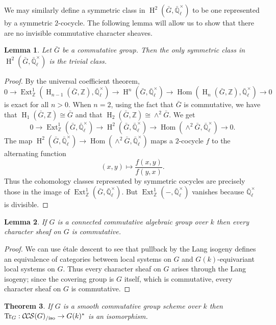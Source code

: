 \documentclass[10pt]{amsart}
\theoremstyle{plain}
\newtheorem{theorem}{Theorem}[section]
\newtheorem{lemma}[theorem]{Lemma}
\theoremstyle{definition}
\newcommand{\ZZ}{{\mathbb{Z}}}
\newcommand{\EE}{\mathbb{\bar Q}_\ell}
\newcommand{\Fq}{k}
\newcommand{\EEx}{\EE^\times}
\DeclareMathOperator{\Hom}{Hom}
\DeclareMathOperator{\Ext}{Ext}
\DeclareMathOperator{\Hh}{H}
\newcommand{\TrFrob}[1]{\operatorname{Tr}_{#1}}
\newcommand{\CCS}{{\mathcal{C\hskip-.8pt C\hskip-0.8pt S}}}
\newcommand{\CCSiso}[1]{\CCS(#1)_{/\text{iso}}}
\newcommand{\bG}{\bar{G}}
\begin{document}
We may similarly define a symmetric class in $\Hh^2(\bG, \EEx)$ to be one represented by a symmetric $2$-cocycle.
The following lemma will allow us to show that there are no invisible commutative character sheaves.

\begin{lemma} \label{lem:symtriv}
Let $\bG$ be a commutative group.  Then the only symmetric class in $\Hh^2(\bG, \EEx)$ is the trivial class.
\end{lemma}

\begin{proof}
By the universal coefficient theorem,
\[
0 \to \Ext^1_\ZZ(\Hh_{n-1}(\bG, \ZZ), \EEx) \to \Hh^n(\bG, \EEx) \to \Hom(\Hh_n(\bG, \ZZ), \EEx) \to 0
\]
is exact for all $n > 0$.  When $n = 2$, using the fact that $\bG$ is commutative, we have that $\Hh_1(\bG, \ZZ) \cong \bG$
and that $\Hh_2(\bG, \ZZ) \cong \wedge^2 \bG$. We get
\[
0 \to \Ext^1_\ZZ(\bG, \EEx) \to \Hh^2(\bG, \EEx) \to \Hom(\wedge^2 \bG, \EEx) \to 0.
\]
The map $\Hh^2(\bG, \EEx) \to \Hom(\wedge^2 \bG, \EEx)$ maps a $2$-cocycle $f$ to the alternating function
\[
(x,y) \mapsto \frac{f(x,y)}{f(y,x)}.
\]
Thus the cohomology classes represented by symmetric cocycles are precisely those in the image of $\Ext^1_\ZZ(\bG, \EEx)$.
But $\Ext^1_\ZZ(-, \EEx)$ vanishes because $\EEx$ is divisible.
\end{proof}

\begin{lemma} \label{lem:conncomm}
If $G$ is a connected commutative algebraic group over $\Fq$ then every character sheaf on $G$ is commutative.
\end{lemma}

\begin{proof}
We can use \'etale descent to see that pullback by the Lang isogeny defines an equivalence
of categories between local systems on $G$ and $G(\Fq)$-equivariant local systems on $G$.  Thus every character
sheaf on $G$ arises through the Lang isogeny; since the covering group is $G$ itself, which is commutative,
every character sheaf on $G$ is commutative.
\end{proof}

\begin{theorem} \label{thm:trfrobiso}
If $G$ is a smooth commutative group scheme over $\Fq$ then $\TrFrob{G} : \CCSiso{G} \to G(\Fq)^*$ is an isomorphism.
\end{theorem}
\end{document}
